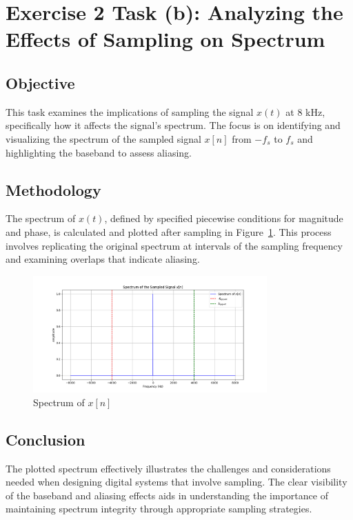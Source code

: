 \item[(b)]
\section*{Exercise 2 Task (b): Analyzing the Effects of Sampling on Spectrum}

\subsection*{Objective}
This task examines the implications of sampling the signal \(x(t)\) at 8 kHz, specifically how it affects the signal's spectrum.
The focus is on identifying and visualizing the spectrum of the sampled signal \(x[n]\) from \(-f_s\) to \(f_s\) and highlighting the baseband to assess aliasing.

\subsection*{Methodology}
The spectrum of \(x(t)\), defined by specified piecewise conditions for magnitude and phase, is calculated and plotted after sampling in Figure~\ref{fig:exercise2b_spectrum}.
This process involves replicating the original spectrum at intervals of the sampling frequency and examining overlaps that indicate aliasing.

\begin{figure}[h]
    \centering
    \includegraphics[width=0.8\textwidth]{fig/ex2_task_b_spectrum}
    \caption{Spectrum of \(x[n]\)}
    \label{fig:exercise2b_spectrum}
\end{figure}

\subsection*{Conclusion}
The plotted spectrum effectively illustrates the challenges and considerations needed when designing digital systems that involve sampling.
The clear visibility of the baseband and aliasing effects aids in understanding the importance of maintaining spectrum integrity through appropriate sampling strategies.

